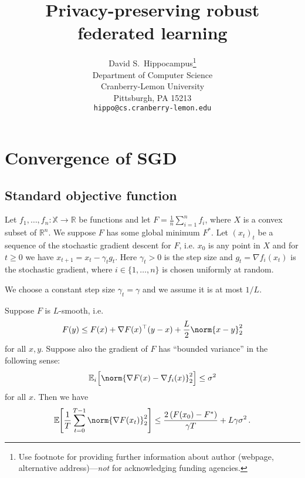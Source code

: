 \documentclass{article}
\title{Privacy-preserving robust federated learning}
\author{%
  David S.~Hippocampus\thanks{Use footnote for providing further information
    about author (webpage, alternative address)---\emph{not} for acknowledging
    funding agencies.} \\
  Department of Computer Science\\
  Cranberry-Lemon University\\
  Pittsburgh, PA 15213 \\
  \texttt{hippo@cs.cranberry-lemon.edu} \\
}
\begin{document}
\maketitle

%    


\section{Convergence of SGD}


\subsection{Standard objective function}


Let $f_1, \ldots, f_n : \mathbb X \to \mathbb R$ be functions and let $F = \frac{1}{n} \sum_{i=1}^n f_i$, where $X$ is a convex subset of $\mathbb R^n$. We suppose $F$ has some global minimum $F^\ast$. Let $(x_t)_t$ be a sequence of the stochastic gradient descent for $F$, i.e. $x_0$ is any point in $X$ and for $t \geq 0$ we have $x_{t+1} = x_t - \gamma_t g_t$. Here $\gamma_t > 0$ is the step size and $g_t = \nabla f_i (x_t)$ is the stochastic gradient, where $i \in \{1, \ldots, n\}$ is chosen uniformly at random.

We choose a constant step size $\gamma_t = \gamma$ and we assume it is at most $1/L$.



\begin{lemma}\label{lem:sgd-convergence}
  Suppose $F$ is $L$-smooth, i.e.
  \[
    F(y) \leq F(x) + \nabla F(x)^\top (y - x) + \frac{L}{2} \norm{x - y}_2^2
  \]
  for all $x, y$. Suppose also the gradient of $F$ has ``bounded variance'' in the following sense:
  \[
    \expec[i]{\norm{\nabla F(x) - \nabla f_i(x)}_2^2} \leq \sigma^2
  \]
  for all $x$.
  Then we have
  \[
    \expec{ \frac{1}{T} \sum_{t=0}^{T-1} \norm{\nabla F(x_t)}_2^2 }
    \leq
    \frac{2\left(F(x_0) - F^\ast\right)}{\gamma T} + L \gamma \sigma^2
    \, .
  \]
\end{lemma}
\end{document}
